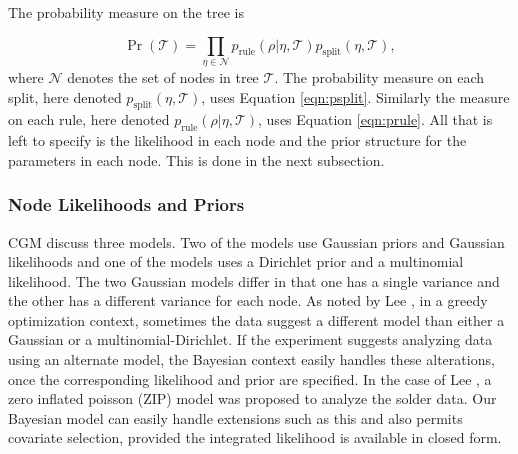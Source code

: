  The probability measure on the tree is  
 
 \begin{equation}
 \Pr(\mathcal{T}) = \prod_{\eta \in \mathcal{N}} p_{\text{rule}}(\rho \vert \eta, \mathcal{T})p_{\text{split}}(\eta, \mathcal{T}),
\end{equation}
where $\mathcal{N}$ denotes the set of nodes in tree $\mathcal{T}$.
The probability measure on each split, here denoted $p_{\text{split}}(\eta, \mathcal{T})$, uses Equation \ref{eqn:psplit}. Similarly the measure on each rule, here denoted $p_{\text{rule}}(\rho \vert \eta, \mathcal{T})$, uses Equation \ref{eqn:prule}. 
All that is left to specify is the likelihood in each node and the prior structure for the parameters in each node. This is done in the next subsection. 

\subsubsection{Node Likelihoods and Priors}

CGM discuss three models. Two of the models use Gaussian priors and Gaussian likelihoods and one of the models uses a Dirichlet prior and a multinomial likelihood. The two Gaussian models differ in that one has a single variance and the other has a different variance for each node. As noted by Lee \cite{lee2006decision}, in a greedy optimization context, sometimes the data suggest a different model than either a Gaussian or a multinomial-Dirichlet. If the experiment suggests analyzing data using an alternate model, the Bayesian context easily handles these alterations, once the corresponding likelihood and prior are specified. In the case of Lee \cite{lee2006decision}, a zero inflated poisson (ZIP) model was proposed to analyze the solder data. Our Bayesian model can easily handle extensions such as this and also permits covariate selection, provided the integrated likelihood is available in closed form.

